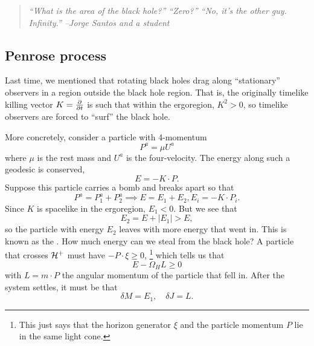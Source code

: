 \begin{quote}
    \textit{``What is the area of the black hole?'' ``Zero?'' ``No, it's the other guy. Infinity.'' --Jorge Santos and a student}
\end{quote}

\subsection*{Penrose process} 
Last time, we mentioned that rotating black holes drag along ``stationary'' observers in a region outside the black hole region. That is, the originally timelike killing vector $K=\P{}{t}$ is such that within the ergoregion, $K^2>0$, so timelike observers are forced to ``surf'' the black hole.

More concretely, consider a particle with 4-momentum
\begin{equation}
    P^a =  \mu U^a
\end{equation}
where $\mu$ is the rest mass and $U^a$ is the four-velocity.
The energy along such a geodesic is conserved,
\begin{equation}
    E=-K \cdot P.
\end{equation}
Suppose this particle carries a bomb and breaks apart so that
\begin{equation}
    P^a = P_1^a + P_2^a\implies E=E_1+E_2, E_i=-K\cdot P_i.
\end{equation}
Since $K$ is spacelike in the ergoregion, $E_1<0$. But we see that
\begin{equation}
    E_2 = E +|E_1| >E,
\end{equation}
so the particle with energy $E_2$ leaves with more energy that went in.
This is known as the . How much energy can we steal from the black hole? A particle that crosses $\cH^+$ must have $-P\cdot \xi \geq 0$,%
    \footnote{This just says that the horizon generator $\xi$ and the particle momentum $P$ lie in the same light cone.}
which tells us that
\begin{equation}
    E-\Omega_H L \geq 0
\end{equation}
with $L= m \cdot P$ the angular momentum of the particle that fell in. After the system settles, it must be that
\begin{equation}
    \delta M = E_1, \quad \delta J=L.
\end{equation}
